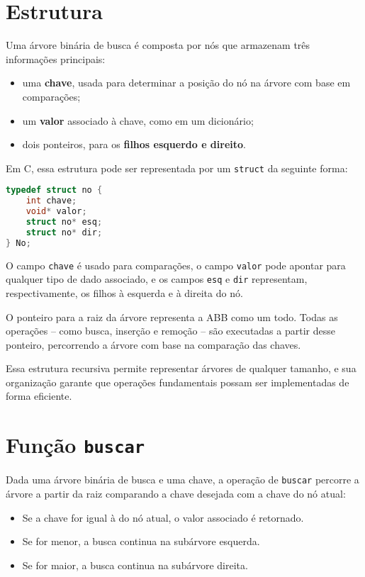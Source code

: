 \section{Estrutura}

Uma árvore binária de busca é composta por nós que armazenam três informações principais:

\begin{itemize}
  \item uma \textbf{chave}, usada para determinar a posição do nó na árvore com base em comparações;
  \item um \textbf{valor} associado à chave, como em um dicionário;
  \item dois ponteiros, para os \textbf{filhos esquerdo e direito}.
\end{itemize}

Em C, essa estrutura pode ser representada por um \texttt{struct} da seguinte forma:

\begin{lstlisting}[language=C, caption={Estrutura de um nó de ABB}]
typedef struct no {
    int chave;
    void* valor;
    struct no* esq;
    struct no* dir;
} No;
\end{lstlisting}

O campo \texttt{chave} é usado para comparações, o campo \texttt{valor} pode apontar para qualquer tipo de dado associado, e os campos \texttt{esq} e \texttt{dir} representam, respectivamente, os filhos à esquerda e à direita do nó.

O ponteiro para a raiz da árvore representa a ABB como um todo. 
Todas as operações -- como busca, inserção e remoção -- são executadas a partir desse ponteiro, percorrendo a árvore com base na comparação das chaves.

Essa estrutura recursiva permite representar árvores de qualquer tamanho, e sua organização garante que operações fundamentais possam ser implementadas de forma eficiente.

\section{Função {\tt buscar}}

Dada uma árvore binária de busca e uma chave, a operação de \texttt{buscar} percorre a árvore a partir da raiz comparando a chave desejada com a chave do nó atual:

\begin{itemize}
  \item Se a chave for igual à do nó atual, o valor associado é retornado.
  \item Se for menor, a busca continua na subárvore esquerda.
  \item Se for maior, a busca continua na subárvore direita.
\end{itemize}

